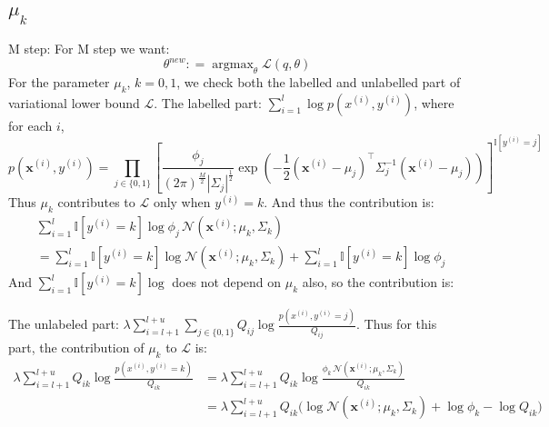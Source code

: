 \documentclass[lang=cn,11pt]{elegantbook}
\begin{document}
\subsection{$\mu_k$}
M step:
For M step we want:
\[
\theta^{new} : = \operatorname{argmax}_\theta \mathcal{L}(q, \theta)
\]
For the parameter ${\mu}_k$, $k=0,1$, we check both the labelled and unlabelled part of variational lower bound $\mathcal{L}$.
The labelled part: $ \sum_{i=1}^l \log p(x^{(i)}, y^{(i)}) $, where for each $i$, 
\[
p\left(\mathbf{x}^{(i)}, y^{(i)}\right)=\prod_{j \in\{0,1\}}\left[\frac{\phi_j}{(2 \pi)^{\frac{M}{2}}\left|{\Sigma}_j\right|^{\frac{1}{2}}} \exp \left(-\frac{1}{2}\left(\mathbf{x}^{(i)}-{\mu}_j\right)^{\top} {\Sigma}_j^{-1}\left(\mathbf{x}^{(i)}-{\mu}_j\right)\right)\right]^{\mathbb{I}\left[y^{(i)}=j\right]}	
\]
Thus ${\mu}_k$ contributes to $\mathcal{L}$ only when $y^{(i)}=k$. And thus the contribution is:
\begin{align*}
   & \sum_{i=1}^l \mathbb{I}\left[y^{(i)}=k\right] \log  \phi_j\,\mathcal{N}\left(\mathbf{x}^{(i)} ; {\mu}_k, {\Sigma}_k\right) \\&= \sum_{i=1}^l \mathbb{I}\left[y^{(i)}=k\right] \log  \mathcal{N}\left(\mathbf{x}^{(i)} ; {\mu}_k, {\Sigma}_k\right) + \sum_{i=1}^l \mathbb{I}\left[y^{(i)}=k\right] \log  \phi_j\
\end{align*}
And $\sum_{i=1}^l \mathbb{I}\left[y^{(i)}=k\right] \log  $ does not depend on $\mu_k$ also, so the contribution is:



The unlabeled part: $\lambda \sum_{i=l+1}^{l+u} \sum_{j \in \{0,1\}} Q_{ij} \log \frac{p(x^{(i)}, y^{(i)} = j)}{Q_{ij}} $. Thus for this part, the contribution of ${\mu}_k$ to $\mathcal{L} $ is: 
\begin{align*}
    \lambda \sum_{i=l+1}^{l+u} Q_{i k}  \log   \frac{p(x^{(i)}, y^{(i)} =k)}{Q_{ik}} & =  \lambda \sum_{i=l+1}^{l+u} Q_{i k}  \log   \frac{\phi_k\, \mathcal{N}\left(\mathbf{x}^{(i)} ; {\mu}_k, {\Sigma}_k\right)  }{Q_{ik}}\\
    &= \lambda \sum_{i=l+1}^{l+u} Q_{i k}  \bigg(\log  {\mathcal{N}\left(\mathbf{x}^{(i)} ; {\mu}_k, {\Sigma}_k\right)} + \log \phi_k   -  \log {Q_{ik}}  \bigg) 
\end{align*}
\end{document}
